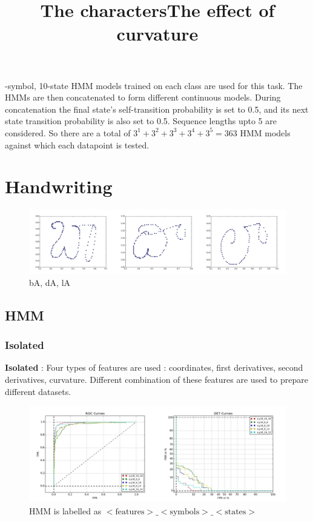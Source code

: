 \documentclass{article}
\begin{document}
-symbol, 10-state HMM models trained on each class are used for this task. The HMMs are then concatenated to form different continuous models. During concatenation the final state's self-transition probability is set to 0.5, and its next state transition probability is also set to 0.5. Sequence lengths upto 5 are considered. So there are a total of $ 3^1 + 3^2 + 3^3 + 3^4 + 3^5 = 363$ HMM models against which each datapoint is tested.

\section{Handwriting}
\begin{figure}[h!]
\centering
\title{The characters}
\includegraphics[width=\textwidth]{handwriting/plots/viz/train/bAdAlA.jpg}
\caption{bA, dA, lA}
\end{figure}
\subsection{HMM}
\subsubsection{Isolated}
\textbf{Isolated} : Four types of features are used : coordinates, first derivatives, second derivatives, curvature. Different combination of these features are used to prepare different datasets.

\begin{figure}[h!]
\centering
\title{The effect of curvature}
\includegraphics[width=\textwidth]{handwriting/plots/hmm/roc_det_x,y,kt.jpg}
\caption{HMM is labelled as $<\text{features}>\_<\text{symbols}>\_<\text{states}>$}
\end{figure}
\end{document}
